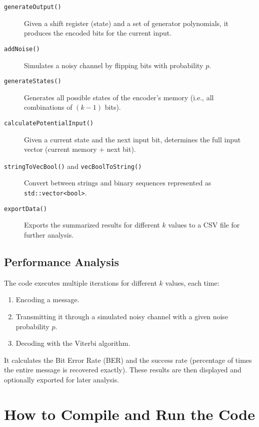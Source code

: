 \documentclass[12pt,a4paper]{article}
\begin{document}
\begin{description}
    \item[\texttt{generateOutput()}]
    Given a shift register (state) and a set of generator polynomials, it produces the encoded bits for the current input.

    \item[\texttt{addNoise()}]
    Simulates a noisy channel by flipping bits with probability $p$.

    \item[\texttt{generateStates()}]
    Generates all possible states of the encoder's memory (i.e., all combinations of $(k-1)$ bits).

    \item[\texttt{calculatePotentialInput()}]
    Given a current state and the next input bit, determines the full input vector (current memory + next bit).

    \item[\texttt{stringToVecBool()} and \texttt{vecBoolToString()}]
    Convert between strings and binary sequences represented as \texttt{std::vector<bool>}.

    \item[\texttt{exportData()}]
    Exports the summarized results for different $k$ values to a CSV file for further analysis.
\end{description}

\subsection{Performance Analysis}

The code executes multiple iterations for different $k$ values, each time:
\begin{enumerate}
    \item Encoding a message.
    \item Transmitting it through a simulated noisy channel with a given noise probability $p$.
    \item Decoding with the Viterbi algorithm.
\end{enumerate}

It calculates the Bit Error Rate (BER) and the success rate (percentage of times the entire message is recovered exactly). These results are then displayed and optionally exported for later analysis.

\section{How to Compile and Run the Code}
\end{document}
